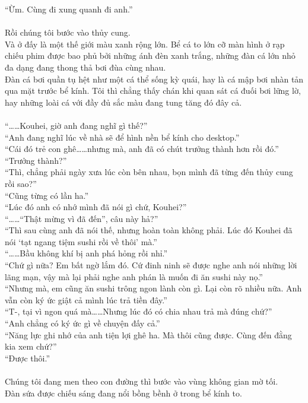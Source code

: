 \documentclass[12pt,a4paper, twosides]{book}
\begin{document}
“Ừm. Cùng đi xung quanh đi anh.”\\
\\
Rồi chúng tôi bước vào thủy cung.\\
Và ở đấy là một thế giới màu xanh rộng lớn. Bể cá to lớn cỡ màn hình ở rạp chiếu phim được bao phủ bởi những ánh đèn xanh trắng, những đàn cá lớn nhỏ đa dạng đang thong thả bơi đùa cùng nhau.\\
Đàn cá bơi quần tụ hệt như một cá thể sống kỳ quái, hay là cá mập bơi nhàn tản qua mặt trước bể kính. Tôi thì chẳng thấy chán khi quan sát cá đuối bơi lững lờ, hay những loài cá với đầy đủ sắc màu đang tung tăng đó đây cả.\\
\\
“……Kouhei, giờ anh đang nghĩ gì thế?”\\
“Anh đang nghĩ lúc về nhà sẽ để hình nền bể kính cho desktop.”\\
“Cái đó trẻ con ghê……nhưng mà, anh đã có chút trưởng thành hơn rồi đó.”\\
“Trưởng thành?”\\
“Thì, chẳng phải ngày xưa lúc còn bên nhau, bọn mình đã từng đến thủy cung rồi sao?”\\
“Cũng từng có lần ha.”\\
“Lúc đó anh có nhớ mình đã nói gì chứ, Kouhei?”\\
“……“Thật mừng vì đã đến”, câu này hả?”\\
“Thì sau cùng anh đã nói thế, nhưng hoàn toàn không phải. Lúc đó Kouhei đã nói ‘tạt ngang tiệm sushi rồi về thôi’ mà.”\\
“……Bầu không khí bị anh phá hỏng rồi nhỉ.”\\
“Chứ gì nữa? Em bất ngờ lắm đó. Cứ đinh ninh sẽ được nghe anh nói những lời lãng mạn, vậy mà lại phải nghe anh phán là muốn đi ăn sushi này nọ.”\\
“Nhưng mà, em cũng ăn sushi trông ngon lành còn gì. Lại còn rõ nhiều nữa. Anh vẫn còn ký ức giật cả mình lúc trả tiền đây.”\\
“T-, tại vì ngon quá mà……Nhưng lúc đó có chia nhau trả mà đúng chứ?”\\
“Anh chẳng có ký ức gì về chuyện đấy cả.”\\
“Năng lực ghi nhớ của anh tiện lợi ghê ha. Mà thôi cũng được. Cùng đến đằng kia xem chứ?”\\
“Được thôi.”\\
\\
Chúng tôi đang men theo con đường thì bước vào vùng không gian mờ tối.\\
Đàn sứa được chiếu sáng đang nổi bồng bềnh ở trong bể kính to.\\
\end{document}
